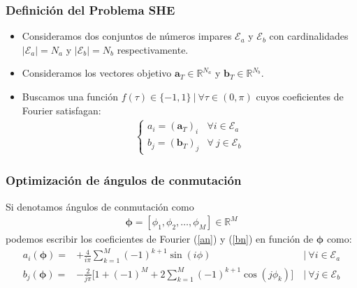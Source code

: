 \begin{frame}
    
    \frametitle{Definición del Problema SHE}

    \begin{problem}
        \begin{itemize}
            \item Consideramos dos conjuntos de números impares $\mathcal{E}_a$ y $\mathcal{E}_b$ con cardinalidades $|\mathcal{E}_a| = N_a$ y  $|\mathcal{E}_b| = N_b$ respectivamente.
            \item Consideramos los vectores objetivo $\bm{a}_T  \in \mathbb{R}^{N_a}$ y $\bm{b}_T  \in \mathbb{R}^{N_b}$.
            \item  Buscamos una función  $f(\tau )  \in \{-1,1\} \ | \  \forall  \tau \in (0,\pi)$  cuyos coeficientes de Fourier satisfagan: 
            \begin{gather}
                \begin{cases}
                    a_i = (\bm{a}_T)_i & \forall i \in \mathcal{E}_a \\
                    b_j = (\bm{b}_T)_j & \forall \ j \in \mathcal{E}_b
                \end{cases}
            \end{gather}

        \end{itemize}
    \end{problem}
\end{frame}

\begin{frame}
    \frametitle{Optimización de ángulos de conmutación}
    Si denotamos ángulos de conmutación como 
    \begin{gather}
        \bm{\phi} = [\phi_1,\phi_2,\dots,\phi_M] \in \mathbb{R}^M 
    \end{gather}
    podemos escribir los coeficientes de Fourier (\ref{an}) y (\ref{bn}) en función de $\bm{\phi}$ como: 
    \begin{align}
        a_i(\bm{\phi})  = & +\frac{4}{i\pi} \sum_{k=1}^{M} (-1)^{k+1}\sin(i\phi)  & \ | \ \forall i \in \mathcal{E}_a \\
        b_j(\bm{\phi})  = & - \frac{2}{j\pi  } \bigg[ 1  + (-1)^{M}+ 2\sum_{k=1}^M  (-1)^{k+1}\cos(j\phi_k) \bigg] & \ | \ \forall j \in \mathcal{E}_b
    \end{align}
\end{frame}

